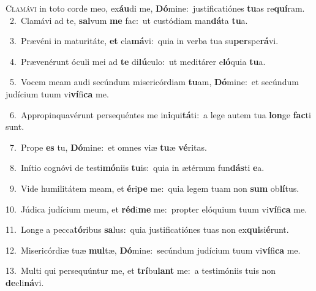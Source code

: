 \lettrine{\initial\textcolor{\initialcolor}{C}}{lamávi} in toto corde meo, ex\-\textbf{áu}\-di me, \textbf{Dó}\-mine:~\star justificatiónes \textbf{tu}\-as re\-\textbf{quí}\-ram.\\
{\numbfont\textcolor{\numbcolor}{~2.}}~Clamávi ad te, \textbf{sal}\-vum \textbf{me} fac:~\star ut custódiam man\-\textbf{dá}\-ta \textbf{tu}\-a.\par
{\numbfont\textcolor{\numbcolor}{~3.}}~Prævéni in maturitáte, \textbf{et} cla\-\textbf{má}\-vi:~\star quia in verba tua su\-\textbf{per}\-spe\-\textbf{rá}\-vi.\par
{\numbfont\textcolor{\numbcolor}{~4.}}~Prævenérunt óculi mei ad \textbf{te} di\-\textbf{lú}\-culo:~\star ut meditárer e\-\textbf{ló}\-quia \textbf{tu}\-a.\par
{\numbfont\textcolor{\numbcolor}{~5.}}~Vocem meam audi secúndum misericórdiam \textbf{tu}\-am, \textbf{Dó}\-mine:~\star et secúndum judícium tuum vi\-\textbf{ví}\-fi\textbf{ca} me.\par
{\numbfont\textcolor{\numbcolor}{~6.}}~Appropinquavérunt persequéntes me in\-\textbf{i}\-qui\-\textbf{tá}\-ti:~\star a lege autem tua \textbf{lon}\-ge \textbf{fac}\-ti sunt.\par
{\numbfont\textcolor{\numbcolor}{~7.}}~Prope \textbf{es} tu, \textbf{Dó}\-mine:~\star et omnes viæ \textbf{tu}\-æ \textbf{vé}\-ritas.\par
{\numbfont\textcolor{\numbcolor}{~8.}}~Inítio cognóvi de testi\-\textbf{mó}\-niis \textbf{tu}\-is:~\star quia in ætérnum fun\-\textbf{dás}\-ti \textbf{e}\-a.\par
{\numbfont\textcolor{\numbcolor}{~9.}}~Vide humilitátem meam, et \textbf{é}\-ri\textbf{pe} me:~\star quia legem tuam non \textbf{sum} ob\-\textbf{lí}\-tus.\par
{\numbfont\textcolor{\numbcolor}{10.}}~Júdica judícium meum, et \textbf{réd}\-i\textbf{me} me:~\star propter elóquium tuum vi\-\textbf{ví}\-fi\textbf{ca} me.\par
{\numbfont\textcolor{\numbcolor}{11.}}~Longe a pecca\-\textbf{tó}\-ribus \textbf{sa}\-lus:~\star quia justificatiónes tuas non ex\-\textbf{qui}\-si\-\textbf{é}\-runt.\par
{\numbfont\textcolor{\numbcolor}{12.}}~Misericórdiæ tuæ \textbf{mul}\-tæ, \textbf{Dó}\-mine:~\star secúndum judícium tuum vi\-\textbf{ví}\-fi\textbf{ca} me.\par
{\numbfont\textcolor{\numbcolor}{13.}}~Multi qui persequúntur me, et \textbf{trí}\-bu\textbf{lant} me:~\star a testimóniis tuis non \textbf{de}\-cli\-\textbf{ná}\-vi.\par
